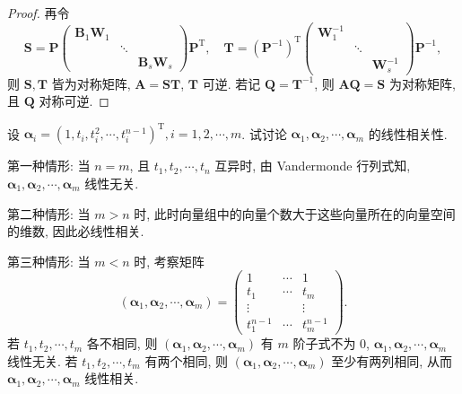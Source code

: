 \documentclass[../../main.tex]{subfiles}%
\begin{document}
\begin{proof}
再令
$$
\boldsymbol{S} = \boldsymbol{P}\begin{pmatrix}
\boldsymbol{B}_1\boldsymbol{W}_1 & & \\
& \ddots & \\
& & \boldsymbol{B}_s\boldsymbol{W}_s
\end{pmatrix}\boldsymbol{P}^{\mathrm{T}},
\quad
\boldsymbol{T} = (\boldsymbol{P}^{-1})^{\mathrm{T}}\begin{pmatrix}
\boldsymbol{W}_1^{-1} & & \\
& \ddots & \\
& & \boldsymbol{W}_s^{-1}
\end{pmatrix}\boldsymbol{P}^{-1},
$$
则 $\boldsymbol{S}, \boldsymbol{T}$ 皆为对称矩阵, $\boldsymbol{A} = \boldsymbol{S}\boldsymbol{T}$, $\boldsymbol{T}$ 可逆. 若记 $\boldsymbol{Q} = \boldsymbol{T}^{-1}$, 则 $\boldsymbol{A}\boldsymbol{Q} = \boldsymbol{S}$ 为对称矩阵, 且 $\boldsymbol{Q}$ 对称可逆.

\end{proof}

\begin{example}
设 $\boldsymbol{\alpha}_i = (1, t_i, t_i^2, \cdots, t_i^{n-1})^{\mathrm{T}}, i = 1, 2, \cdots, m$. 试讨论 $\boldsymbol{\alpha}_1, \boldsymbol{\alpha}_2, \cdots, \boldsymbol{\alpha}_m$ 的线性相关性.
\end{example}
\begin{solution}

第一种情形: 当 $n = m$, 且 $t_1, t_2, \cdots, t_n$ 互异时, 由 Vandermonde 行列式知, $\boldsymbol{\alpha}_1, \boldsymbol{\alpha}_2, \cdots, \boldsymbol{\alpha}_m$ 线性无关.

第二种情形: 当 $m > n$ 时, 此时向量组中的向量个数大于这些向量所在的向量空间的维数, 因此必线性相关.

第三种情形: 当 $m < n$ 时, 考察矩阵
$$
\left( \boldsymbol{\alpha}_1, \boldsymbol{\alpha}_2, \cdots, \boldsymbol{\alpha}_m \right) = \begin{pmatrix}
1 & \cdots & 1 \\
t_1 & \cdots & t_m \\
\vdots & & \vdots \\
t_1^{n-1} & \cdots & t_m^{n-1}
\end{pmatrix}.
$$
若 $t_1, t_2, \cdots, t_m$ 各不相同, 则 $\left( \boldsymbol{\alpha}_1, \boldsymbol{\alpha}_2, \cdots, \boldsymbol{\alpha}_m \right)$ 有 $m$ 阶子式不为 $0$, $\boldsymbol{\alpha}_1, \boldsymbol{\alpha}_2, \cdots, \boldsymbol{\alpha}_m$ 线性无关. 若 $t_1, t_2, \cdots, t_m$ 有两个相同, 则 $\left( \boldsymbol{\alpha}_1, \boldsymbol{\alpha}_2, \cdots, \boldsymbol{\alpha}_m \right)$ 至少有两列相同, 从而 $\boldsymbol{\alpha}_1, \boldsymbol{\alpha}_2, \cdots, \boldsymbol{\alpha}_m$ 线性相关.

\end{solution}
\end{document}
